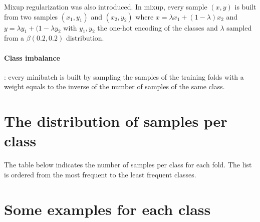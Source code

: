 \documentclass{article}
\begin{document}
Mixup regularization was also introduced. In mixup, every sample $(x, y)$ is built from two samples $(x_1, y_1)$ and $(x_2,y_2)$ where $x = \lambda x_1 + (1-\lambda)x_2$ and $y = \lambda y_1 + (1-\lambda y_2$ with $y_1, y_2$ the one-hot encoding of the classes and $\lambda$ sampled from a $\beta(0.2, 0.2)$ distribution.

\paragraph{Class imbalance}: every minibatch is built by sampling the samples of the training folds with a weight equals to the inverse of the number of samples of the same class.




\clearpage

\appendix

\section*{The distribution of samples per class}

The table below indicates the number of samples per class for each fold. The list is ordered from the most frequent to the least frequent classes.



\pagebreak\newpage
\section*{Some examples for each class}


\end{document}
